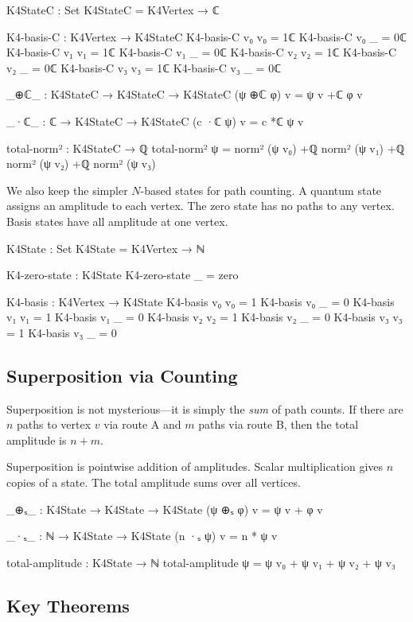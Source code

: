 \documentclass[11pt,a4paper]{book}
\def\mathbb#1{#1}%
\begin{document}
\begin{code}
K4StateC : Set
K4StateC = K4Vertex → ℂ

K4-basis-C : K4Vertex → K4StateC
K4-basis-C v₀ v₀ = 1ℂ
K4-basis-C v₀ _  = 0ℂ
K4-basis-C v₁ v₁ = 1ℂ
K4-basis-C v₁ _  = 0ℂ
K4-basis-C v₂ v₂ = 1ℂ
K4-basis-C v₂ _  = 0ℂ
K4-basis-C v₃ v₃ = 1ℂ
K4-basis-C v₃ _  = 0ℂ

_⊕ℂ_ : K4StateC → K4StateC → K4StateC
(ψ ⊕ℂ φ) v = ψ v +ℂ φ v

_·ℂ_ : ℂ → K4StateC → K4StateC
(c ·ℂ ψ) v = c *ℂ ψ v

total-norm² : K4StateC → ℚ
total-norm² ψ = norm² (ψ v₀) +ℚ norm² (ψ v₁) +ℚ norm² (ψ v₂) +ℚ norm² (ψ v₃)
\end{code}

We also keep the simpler $\mathbb{N}$-based states for path counting. A quantum state assigns an amplitude to each vertex. The zero state has no paths to any vertex. Basis states have all amplitude at one vertex.

\begin{code}
K4State : Set
K4State = K4Vertex → ℕ

K4-zero-state : K4State
K4-zero-state _ = zero

K4-basis : K4Vertex → K4State
K4-basis v₀ v₀ = 1
K4-basis v₀ _  = 0
K4-basis v₁ v₁ = 1
K4-basis v₁ _  = 0
K4-basis v₂ v₂ = 1
K4-basis v₂ _  = 0
K4-basis v₃ v₃ = 1
K4-basis v₃ _  = 0
\end{code}

\subsection{Superposition via Counting}

Superposition is not mysterious—it is simply the \emph{sum} of path counts.
If there are $n$ paths to vertex $v$ via route A and $m$ paths via route B,
then the total amplitude is $n + m$.

Superposition is pointwise addition of amplitudes. Scalar multiplication gives $n$ copies of a state. The total amplitude sums over all vertices.

\begin{code}
_⊕ₛ_ : K4State → K4State → K4State
(ψ ⊕ₛ φ) v = ψ v + φ v

_·ₛ_ : ℕ → K4State → K4State
(n ·ₛ ψ) v = n * ψ v

total-amplitude : K4State → ℕ
total-amplitude ψ = ψ v₀ + ψ v₁ + ψ v₂ + ψ v₃
\end{code}

\subsection{Key Theorems}
\end{document}
